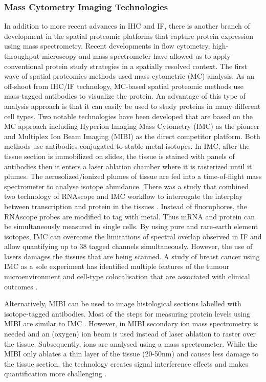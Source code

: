 \subsubsection{Mass Cytometry Imaging Technologies}
In addition to more recent advances in IHC and IF, there is another branch of development in the spatial proteomic platforms that capture protein expression using mass spectrometry. Recent developments in flow cytometry, high-throughput microscopy and mass spectrometer have allowed us to apply conventional protein study strategies in a spatially resolved context. The first wave of spatial proteomics methods used mass cytometric (MC) analysis. As an off-shoot from IHC/IF technology, MC-based spatial proteomic methods use mass-tagged antibodies to visualize the protein. An advantage of this type of analysis approach is that it can easily be used to study proteins in many different cell types. Two notable technologies have been developed that are based on the MC approach including Hyperion Imaging Mass Cytometry (IMC) as the pioneer and Multiplex Ion Beam Imaging (MIBI) as the direct competitor platform. Both methods use antibodies conjugated to stable metal isotopes. In IMC, after the tissue section is immobilized on slides, the tissue is stained with panels of antibodies then it enters a laser ablation chamber where it is rasterized until it plumes. The aerosolized/ionized plumes of tissue are fed into a time-of-flight mass spectrometer to analyse isotope abundance.  There was a study that combined two technology of RNAscope and IMC workflow to interrogate the interplay between transcription and protein in the tissues \cite{schulz2018simultaneous}. Instead of fluorophores, the RNAscope probes are modified to tag with metal. Thus mRNA and protein can be simultaneously measured in single cells. By using pure and rare-earth element isotopes, IMC can overcome the limitations of spectral overlap observed in IF and allow quantifying up to 38 tagged channels simultaneously. However, the use of lasers damages the tissues that are being scanned. A study of breast cancer using IMC as a sole experiment has identified multiple features of the tumour microenvironment and cell-type colocalisation that are associated with clinical outcomes \cite{jackson2020single}.

Alternatively, MIBI can be used to image histological sections labelled with isotope-tagged antibodies. Most of the steps for measuring protein levels using MIBI are similar to IMC \cite{baharlou2019mass}. However, in MIBI secondary ion mass spectrometry is needed and  an (oxygen) ion beam is used instead of laser ablation to raster over the tissue. Subsequently, ions are analysed using a mass spectrometer. While the MIBI only ablates a thin layer of the tissue (20-50nm) and causes less damage to the tissue section, the technology creates signal interference effects and makes quantification more challenging \cite{bodenmiller2016multiplexed}.

